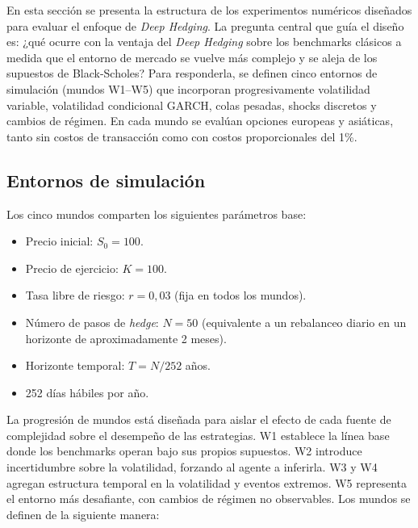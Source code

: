 \documentclass[11pt,a4paper,spanish]{article}
\numberwithin{equation}{section} %
\begin{document}
En esta sección se presenta la estructura de los experimentos numéricos diseñados para evaluar el enfoque de \textit{Deep Hedging}. La pregunta central que guía el diseño es: ¿qué ocurre con la ventaja del \textit{Deep Hedging} sobre los benchmarks clásicos a medida que el entorno de mercado se vuelve más complejo y se aleja de los supuestos de Black-Scholes? Para responderla, se definen cinco entornos de simulación (mundos W1--W5) que incorporan progresivamente volatilidad variable, volatilidad condicional GARCH, colas pesadas, shocks discretos y cambios de régimen. En cada mundo se evalúan opciones europeas y asiáticas, tanto sin costos de transacción como con costos proporcionales del 1\%.

\subsection{Entornos de simulación}

Los cinco mundos comparten los siguientes parámetros base:

\begin{itemize}
    \item Precio inicial: $S_0 = 100$.
    \item Precio de ejercicio: $K = 100$.
    \item Tasa libre de riesgo: $r = 0{,}03$ (fija en todos los mundos).
    \item Número de pasos de \textit{hedge}: $N = 50$ (equivalente a un rebalanceo diario en un horizonte de aproximadamente 2 meses).
    \item Horizonte temporal: $T = N / 252$ años.
    \item 252 días hábiles por año.
\end{itemize}

La progresión de mundos está diseñada para aislar el efecto de cada fuente de complejidad sobre el desempeño de las estrategias. W1 establece la línea base donde los benchmarks operan bajo sus propios supuestos. W2 introduce incertidumbre sobre la volatilidad, forzando al agente a inferirla. W3 y W4 agregan estructura temporal en la volatilidad y eventos extremos. W5 representa el entorno más desafiante, con cambios de régimen no observables. Los mundos se definen de la siguiente manera:
\end{document}
